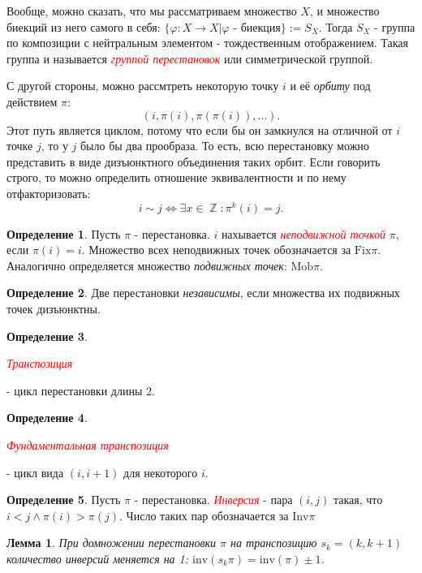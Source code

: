 \documentclass[a4paper,100pt]{article}
\theoremstyle{indented}
\newtheorem{lemma}{Лемма}
\theoremstyle{definition}
\newtheorem{defn}{Определение}
\theoremstyle{remark}
\DeclareMathOperator{\ZZ}{\mathbb{Z}}
\begin{document}
Вообще, можно сказать, что мы рассматриваем множество $X$, и множество биекций из него самого в себя: $\{\varphi: X\rightarrow X \vert \varphi \text{ - биекция}\}:=S_X$. Тогда $S_X$ - группа по композиции с нейтральным элементом - тождественным отображением. Такая группа и называется \hypertarget{n72}{\textcolor{red}{\textit{группой перестановок}}} или симметрической группой.\ 

С другой стороны, можно рассмтреть некоторую точку $i$ и её \textit{орбиту} под действием $\pi$:
\[
    (i, \pi(i), \pi(\pi(i)), \dots).
\]
Этот путь является циклом, потому что если бы он замкнулся на отличной от $i$ точке $j$, то у $j$ было бы два прообраза. То есть, всю перестановку можно представить в виде дизъюнктного объединения таких орбит. Если говорить строго, то можно определить отношение эквивалентности и по нему отфакторизовать:
\[
    i\sim j \Leftrightarrow \exists x\in \ZZ : \pi^k(i)=j.
\]

\begin{defn}
    Пусть  $\pi$ - перестановка. $i$ нахывается \hypertarget{n73}{\textcolor{red}{\textit{неподвижной точкой}}} $\pi$, если $\pi(i)=i$. Множество всех неподвижных точек обозначается за $\text{Fix} \pi$. Аналогично определяется множество \textit{подвижных точек}: $\text{Mob}\pi$.
\end{defn}

\begin{defn}
    Две перестановки \textit{независимы}, если множества их подвижных точек дизъюнктны.
\end{defn}

\begin{defn}
    \hypertarget{n74}{\textcolor{red}{\textit{Транспозиция}}} - цикл перестановки длины 2.
\end{defn}

\begin{defn}
    \hypertarget{n75}{\textcolor{red}{\textit{Фундаментальная транспозиция}}} - цикл вида $(i, i+1)$ для некоторого $i$.
\end{defn}

\begin{defn}
    Пусть $\pi$ - перестановка. \hypertarget{n76}{\textcolor{red}{\textit{Инверсия}}} - пара $ (i, j)$ такая, что $i<j\wedge \pi(i)>\pi(j)$. Число таких пар обозначается за $\text{Inv} \pi$
\end{defn}

\begin{lemma}
    При домножении перестановки $\pi$ на транспозицию $s_k=(k,k+1)$ количество инверсий меняется на 1: $\text{inv}(s_k\pi)=\text{inv}(\pi)±1$.
\end{lemma}
\end{document}
